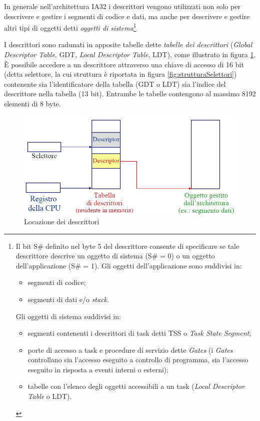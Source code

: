 In generale nell'architettura IA32 i descrittori vengono utilizzati non solo per descrivere e gestire i segmenti di codice e dati, ma anche per descrivere e gestire altri tipi di oggetti detti \textit{oggetti di sistema}\footnote{Il bit S\# definito nel byte 5 del descrittore consente di specificare se tale descrittore descrive un oggetto di sistema (S\# = 0) o un oggetto dell'applicazione (S\# = 1).
Gli oggetti dell'applicazione sono suddivisi in:
\begin{itemize}
\item segmenti di codice;
\item segmenti di dati e/o \textit{stack}.
\end{itemize}
Gli oggetti di sistema suddivisi in:
\begin{itemize}
\item segmenti contenenti i descrittori di task detti TSS o \textit{Task
State Segment};
\item porte di accesso a task e procedure di servizio dette \textit{Gates}
(i \textit{Gates} controllano sia l'accesso eseguito a controllo di
programma, sia l'accesso eseguito in risposta a eventi
interni o esterni);
\item tabelle con l'elenco degli oggetti accessibili a un task (\textit{Local
Descriptor Table} o LDT).
\end{itemize}
}

I descrittori sono radunati in apposite tabelle dette \textit{tabelle dei descrittori} (\textit{Global Descriptor Table}, GDT, \textit{Local Descriptor Table}, LDT), come illustrato in figura \ref{fig:sedeDescrittori}. È possibile accedere a un descrittore attraverso una chiave di accesso di 16 bit (detta selettore, la cui struttura è riportata in figura \ref{fig:strutturaSelettori}) contenente sia l'identificatore della tabella (GDT o LDT) sia l'indice del descrittore nella tabella (13 bit). Entrambe le tabelle contengono al massimo 8192 elementi di 8 byte.

\begin{figure}[!h]
\centering
\includegraphics[width=0.75\columnwidth]{img/sedeDescrittori}
\caption{Locazione dei descrittori}
\label{fig:sedeDescrittori}
\end{figure}

